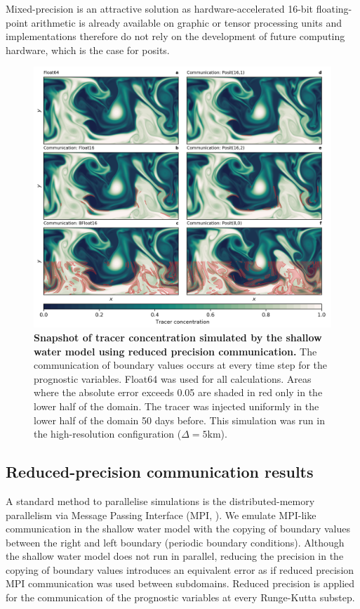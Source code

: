 Mixed-precision is an attractive solution as hardware-accelerated 16-bit floating-point arithmetic is already available on graphic or
tensor processing units and implementations therefore do not rely on the development of future computing hardware, which is the
case for posits.

\begin{figure}
\includegraphics[width=1\textwidth]{Figures/swm/snapshot_comm.png}
\caption{\textbf{Snapshot of tracer concentration simulated by the shallow water model using reduced precision communication.}
The communication of boundary values occurs at every time step for the prognostic variables. Float64 was used for all calculations.
Areas where the absolute error exceeds 0.05 are shaded in red only in the lower half of the domain. The tracer was injected uniformly
in the lower half of the domain 50 days before. This simulation was run in the high-resolution configuration ($\Delta = 5$km).}
\label{fig:snapshot_comm}
\end{figure}

\subsection{Reduced-precision communication results}
\label{sec:swm_results_comm}

A standard method to parallelise simulations is the distributed-memory parallelism via Message Passing Interface (MPI, \cite{TheMPIForum1993}).
We emulate MPI-like communication in the shallow water model with the copying of boundary values between the right and left boundary (periodic
boundary conditions). Although the shallow water model does not run in parallel, reducing the precision in the copying of boundary values
introduces an equivalent error as if reduced precision MPI communication was used between subdomains. Reduced precision is applied
for the communication of the prognostic variables at every Runge-Kutta substep.

